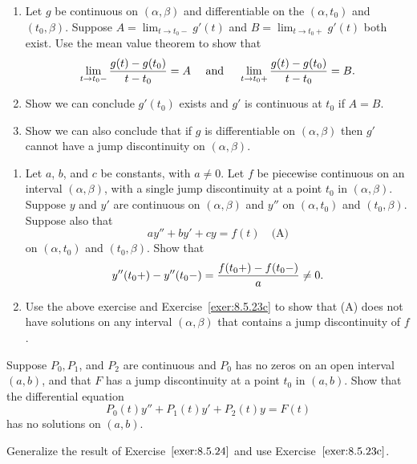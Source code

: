 \documentclass{ximera}
\begin{document}
\begin{problem}\label{exer:8.5.23}
\begin{enumerate}
\item %
Let $g$ be  continuous on  $(\alpha,\beta)$
 and differentiable on the  $(\alpha,t_0)$
and $(t_0,\beta)$. Suppose $A=\lim_{t\to t_0-}g'(t)$
and $B=\lim_{t\to t_0+}g'(t)$ both exist. Use the mean value theorem
to show that
$$
\lim_{t\to t_0-}{g(t)-g(t_0)\over t-t_0}=A\quad\mbox{ and }\quad
\lim_{t\to t_0+}\frac{g(t)-g(t_0)}{t-t_0}=B.
$$
\item %
Show we can conclude $g'(t_0)$ exists and $g'$ is continuous at
$t_0$ if $A=B$.

\item\label{exer:8.5.23c} %
Show we can also conclude
 that if $g$  is differentiable on $(\alpha,\beta)$ then
$g'$ cannot have a jump discontinuity on $(\alpha,\beta)$.
\end{enumerate}
\end{problem}

\begin{problem}\label{exer:8.5.24}
\begin{enumerate}
\item %
Let $a$, $b$, and $c$ be constants, with $a\ne0$. Let $f$ be piecewise
continuous on an interval $(\alpha,\beta)$, with a single jump
discontinuity at a point $t_0$ in $(\alpha,\beta)$. Suppose $y$
and $y'$ are continuous on $(\alpha,\beta)$ and $y''$ on
$(\alpha,t_0)$ and $(t_0,\beta)$. Suppose  also that
$$
ay''+by'+cy=f(t) \quad
\text{(A)}
$$
on $(\alpha,t_0)$ and $(t_0,\beta)$.
Show that
$$
y''(t_0+)-y''(t_0-)={f(t_0+)-f(t_0-)\over a}\ne0.
$$
\item %
Use the above exercise and Exercise~\ref{exer:8.5.23c} to show that
(A)
does not  have  solutions on any interval $(\alpha,\beta)$ that contains
a jump discontinuity of $f$.
\end{enumerate}
\end{problem}

\begin{problem}\label{exer:8.5.25}
Suppose $P_0,P_1$, and $P_2$ are continuous and $P_0$
has no zeros on an open interval $(a,b)$, and  that $F$
has a jump discontinuity at a point $t_0$ in $(a,b)$.
Show that the differential equation
$$
P_0(t)y''+P_1(t)y'+P_2(t)y=F(t)
$$
has no solutions on $(a,b)$.

\begin{hint}
Generalize the result of
Exercise~$\ref{exer:8.5.24}$ and use Exercise~$\ref{exer:8.5.23c}$.
\end{hint}
\end{problem}
\end{document}
